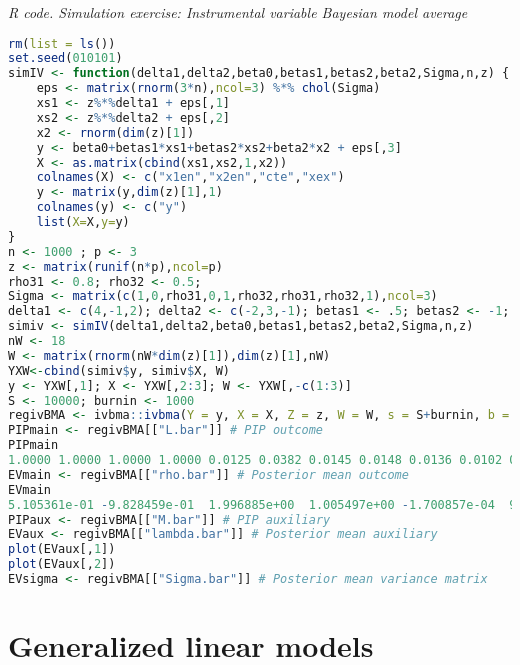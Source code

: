 \begin{tcolorbox}[enhanced,width=4.67in,center upper,
	fontupper=\large\bfseries,drop shadow southwest,sharp corners]
	\textit{R code. Simulation exercise: Instrumental variable Bayesian model average}
	\begin{VF}
		\begin{lstlisting}[language=R]
rm(list = ls())
set.seed(010101)
simIV <- function(delta1,delta2,beta0,betas1,betas2,beta2,Sigma,n,z) {
	eps <- matrix(rnorm(3*n),ncol=3) %*% chol(Sigma)
	xs1 <- z%*%delta1 + eps[,1]
	xs2 <- z%*%delta2 + eps[,2]
	x2 <- rnorm(dim(z)[1])
	y <- beta0+betas1*xs1+betas2*xs2+beta2*x2 + eps[,3]
	X <- as.matrix(cbind(xs1,xs2,1,x2)) 
	colnames(X) <- c("x1en","x2en","cte","xex")
	y <- matrix(y,dim(z)[1],1)
	colnames(y) <- c("y")
	list(X=X,y=y)
}
n <- 1000 ; p <- 3 
z <- matrix(runif(n*p),ncol=p)
rho31 <- 0.8; rho32 <- 0.5;
Sigma <- matrix(c(1,0,rho31,0,1,rho32,rho31,rho32,1),ncol=3)
delta1 <- c(4,-1,2); delta2 <- c(-2,3,-1); betas1 <- .5; betas2 <- -1; beta2 <- 1; beta0 <- 2
simiv <- simIV(delta1,delta2,beta0,betas1,betas2,beta2,Sigma,n,z)
nW <- 18
W <- matrix(rnorm(nW*dim(z)[1]),dim(z)[1],nW)
YXW<-cbind(simiv$y, simiv$X, W)
y <- YXW[,1]; X <- YXW[,2:3]; W <- YXW[,-c(1:3)]
S <- 10000; burnin <- 1000
regivBMA <- ivbma::ivbma(Y = y, X = X, Z = z, W = W, s = S+burnin, b = burnin, odens = S, print.every = round(S/10), run.diagnostics = FALSE)
PIPmain <- regivBMA[["L.bar"]] # PIP outcome
PIPmain
1.0000 1.0000 1.0000 1.0000 0.0125 0.0382 0.0145 0.0148 0.0136 0.0102 0.0070 0.0527 0.0014 0.0077 0.0211 0.0081 0.0047 0.0141 0.0028 0.0063 0.0072 0.0220
EVmain <- regivBMA[["rho.bar"]] # Posterior mean outcome
EVmain
5.105361e-01 -9.828459e-01  1.996885e+00  1.005497e+00 -1.700857e-04  9.946613e-04  1.086717e-04 -1.448951e-04  1.532812e-04  1.356334e-04 -6.027285e-05  9.119699e-04 -1.581408e-05  1.050517e-04 2.488002e-04 -6.229493e-05  4.292825e-05  3.371366e-05  5.345760e-06  5.933764e-05 5.066236e-05 1.516718e-04
PIPaux <- regivBMA[["M.bar"]] # PIP auxiliary
EVaux <- regivBMA[["lambda.bar"]] # Posterior mean auxiliary
plot(EVaux[,1])
plot(EVaux[,2])
EVsigma <- regivBMA[["Sigma.bar"]] # Posterior mean variance matrix
\end{lstlisting}
\end{VF}
\end{tcolorbox} 
     


\section{Generalized linear models}\label{sec10_3}

